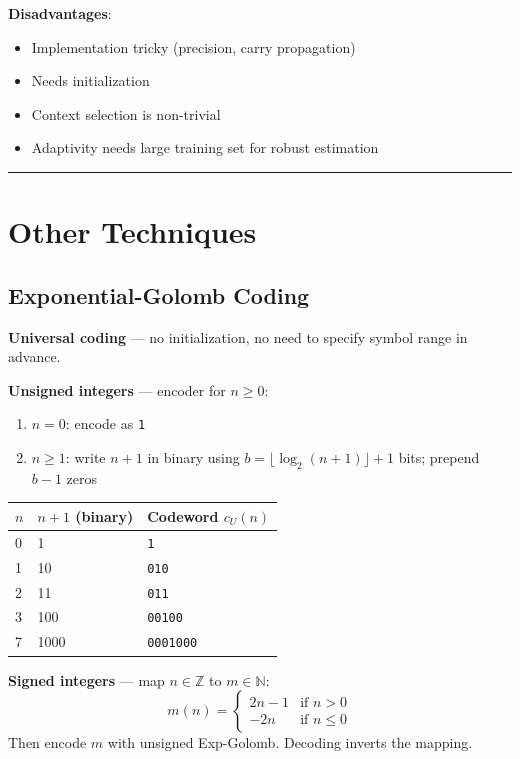 \textbf{Disadvantages}:
\begin{itemize}
\item Implementation tricky (precision, carry propagation)
\item Needs initialization
\item Context selection is non-trivial
\item Adaptivity needs large training set for robust estimation
\end{itemize}

\bigskip\hrule\bigskip

\section{Other Techniques}

\subsection{Exponential-Golomb Coding}

\textbf{Universal coding} — no initialization, no need to specify symbol range in advance.

\textbf{Unsigned integers} — encoder for $n \geq 0$:
\begin{enumerate}
\item $n = 0$: encode as \texttt{1}
\item $n \geq 1$: write $n+1$ in binary using $b = \lfloor\log_2(n+1)\rfloor + 1$ bits; prepend $b-1$ zeros
\end{enumerate}

\begin{center}
\begin{tabular}{|l|l|l|}
\hline
\textbf{$n$} & \textbf{$n+1$ (binary)} & \textbf{Codeword $c_U(n)$} \\ \hline
0 & 1 & \texttt{1} \\ \hline
1 & 10 & \texttt{010} \\ \hline
2 & 11 & \texttt{011} \\ \hline
3 & 100 & \texttt{00100} \\ \hline
7 & 1000 & \texttt{0001000} \\ \hline
\end{tabular}
\end{center}

\textbf{Signed integers} — map $n \in \mathbb{Z}$ to $m \in \mathbb{N}$:
\[
m(n) = \begin{cases} 2n - 1 & \text{if } n > 0 \\ -2n & \text{if } n \leq 0 \end{cases}
\]
Then encode $m$ with unsigned Exp-Golomb. Decoding inverts the mapping.

